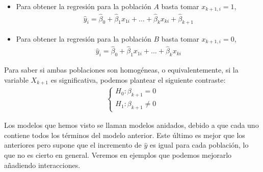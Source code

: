 \begin{enumerate}
\begin{itemize}
        \item Para obtener la regresión para la población $A$ basta tomar $x_{k+1,i} = 1$,
        \begin{align*}
            \widehat{y}_i = \widehat{\beta}_0 + \widehat{\beta}_1 x_{1i} + \ldots + \widehat{\beta}_k x_{ki} + \widehat{\beta}_{k+1}
        \end{align*}
        \item Para obtener la regresión para la población $B$ basta tomar $x_{k+1,i} = 0$,
        \begin{align*}
            \widehat{y}_i = \widehat{\beta}_0 + \widehat{\beta}_1 x_{1i} + \ldots + \widehat{\beta}_k x_{ki} 
        \end{align*}
    \end{itemize}
\noindent Para saber si ambas poblaciones son homogéneas, o equivalentemente, si la variable $X_{k+1}$ es significativa, podemos plantear el siguiente contraste:
    \begin{align*}
        \begin{cases}
            H_0 : \beta_{k+1} = 0 \\
            H_1 : \beta_{k+1} \not = 0
        \end{cases}
    \end{align*}
\end{enumerate}
Los modelos que hemos visto se llaman modelos anidados, debido a que cada uno contiene todos los términos del modelo anterior. Este último es mejor que los anteriores pero supone que el incremento de $\widehat{y}$ es igual para cada población, lo que no es cierto en general. Veremos en ejemplos que podemos mejorarlo añadiendo interacciones.

